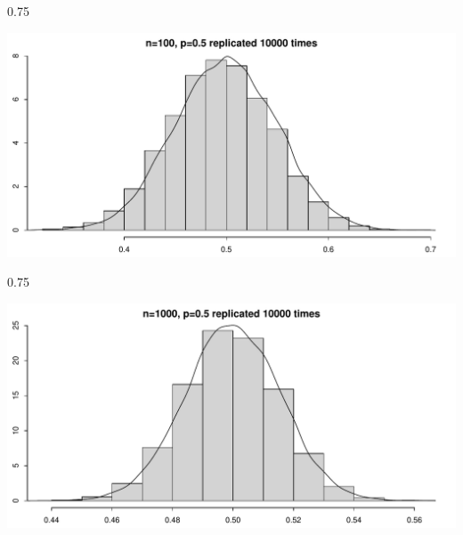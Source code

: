 \documentclass{beamer}\usepackage[]{graphicx}\usepackage[]{color}
\newenvironment{knitrout}{}{} %
\renewenvironment{knitrout}{\begin{spacing}{0.75}\begin{tiny}}{\end{tiny}\end{spacing}}
\begin{document}
\begin{frame}[fragile]

\begin{knitrout}\small
{}\color{fgcolor}

{\centering \includegraphics[width=0.89\linewidth]{figure/graphics-unnamed-chunk-21-1} 

}



\end{knitrout}

\end{frame}

\begin{frame}[fragile]

\begin{knitrout}\small
{}\color{fgcolor}

{\centering \includegraphics[width=0.89\linewidth]{figure/graphics-unnamed-chunk-22-1} 

}



\end{knitrout}

\end{frame}
\end{document}
